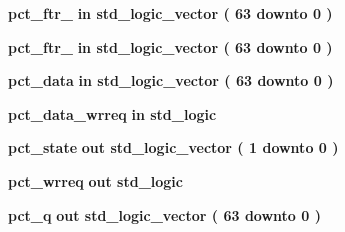 \begin{DoxyCompactItemize}
\item 
{\bf pct\+\_\+ftr\+\_}  {\bfseries {\bfseries \textcolor{keywordflow}{in}\textcolor{vhdlchar}{ }}} {\bfseries \textcolor{comment}{std\+\_\+logic\+\_\+vector}\textcolor{vhdlchar}{ }\textcolor{vhdlchar}{(}\textcolor{vhdlchar}{ }\textcolor{vhdlchar}{ } \textcolor{vhdldigit}{63} \textcolor{vhdlchar}{ }\textcolor{keywordflow}{downto}\textcolor{vhdlchar}{ }\textcolor{vhdlchar}{ } \textcolor{vhdldigit}{0} \textcolor{vhdlchar}{ }\textcolor{vhdlchar}{)}\textcolor{vhdlchar}{ }} 
\item 
{\bf pct\+\_\+ftr\+\_}  {\bfseries {\bfseries \textcolor{keywordflow}{in}\textcolor{vhdlchar}{ }}} {\bfseries \textcolor{comment}{std\+\_\+logic\+\_\+vector}\textcolor{vhdlchar}{ }\textcolor{vhdlchar}{(}\textcolor{vhdlchar}{ }\textcolor{vhdlchar}{ } \textcolor{vhdldigit}{63} \textcolor{vhdlchar}{ }\textcolor{keywordflow}{downto}\textcolor{vhdlchar}{ }\textcolor{vhdlchar}{ } \textcolor{vhdldigit}{0} \textcolor{vhdlchar}{ }\textcolor{vhdlchar}{)}\textcolor{vhdlchar}{ }} 
\item 
{\bf pct\+\_\+data}  {\bfseries {\bfseries \textcolor{keywordflow}{in}\textcolor{vhdlchar}{ }}} {\bfseries \textcolor{comment}{std\+\_\+logic\+\_\+vector}\textcolor{vhdlchar}{ }\textcolor{vhdlchar}{(}\textcolor{vhdlchar}{ }\textcolor{vhdlchar}{ } \textcolor{vhdldigit}{63} \textcolor{vhdlchar}{ }\textcolor{keywordflow}{downto}\textcolor{vhdlchar}{ }\textcolor{vhdlchar}{ } \textcolor{vhdldigit}{0} \textcolor{vhdlchar}{ }\textcolor{vhdlchar}{)}\textcolor{vhdlchar}{ }} 
\item 
{\bf pct\+\_\+data\+\_\+wrreq}  {\bfseries {\bfseries \textcolor{keywordflow}{in}\textcolor{vhdlchar}{ }}} {\bfseries \textcolor{comment}{std\+\_\+logic}\textcolor{vhdlchar}{ }} 
\item 
{\bf pct\+\_\+state}  {\bfseries {\bfseries \textcolor{keywordflow}{out}\textcolor{vhdlchar}{ }}} {\bfseries \textcolor{comment}{std\+\_\+logic\+\_\+vector}\textcolor{vhdlchar}{ }\textcolor{vhdlchar}{(}\textcolor{vhdlchar}{ }\textcolor{vhdlchar}{ } \textcolor{vhdldigit}{1} \textcolor{vhdlchar}{ }\textcolor{keywordflow}{downto}\textcolor{vhdlchar}{ }\textcolor{vhdlchar}{ } \textcolor{vhdldigit}{0} \textcolor{vhdlchar}{ }\textcolor{vhdlchar}{)}\textcolor{vhdlchar}{ }} 
\item 
{\bf pct\+\_\+wrreq}  {\bfseries {\bfseries \textcolor{keywordflow}{out}\textcolor{vhdlchar}{ }}} {\bfseries \textcolor{comment}{std\+\_\+logic}\textcolor{vhdlchar}{ }} 
\item 
{\bf pct\+\_\+q}  {\bfseries {\bfseries \textcolor{keywordflow}{out}\textcolor{vhdlchar}{ }}} {\bfseries \textcolor{comment}{std\+\_\+logic\+\_\+vector}\textcolor{vhdlchar}{ }\textcolor{vhdlchar}{(}\textcolor{vhdlchar}{ }\textcolor{vhdlchar}{ } \textcolor{vhdldigit}{63} \textcolor{vhdlchar}{ }\textcolor{keywordflow}{downto}\textcolor{vhdlchar}{ }\textcolor{vhdlchar}{ } \textcolor{vhdldigit}{0} \textcolor{vhdlchar}{ }\textcolor{vhdlchar}{)}\textcolor{vhdlchar}{ }} 

\end{DoxyCompactItemize}
